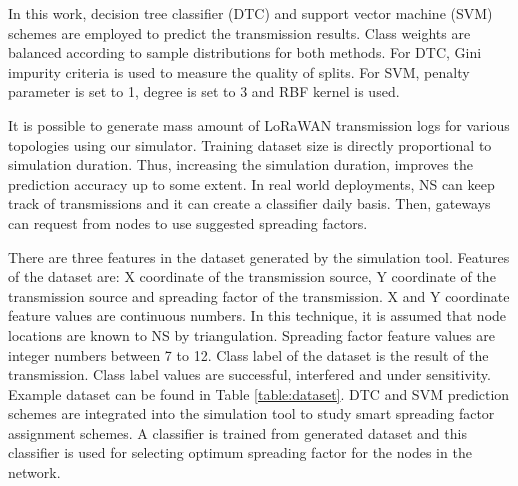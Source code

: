 In this work, decision tree classifier (DTC) and support vector machine (SVM) \cite{Alpaydin} schemes are employed to predict the transmission results. Class weights are balanced according to sample distributions for both methods. For DTC, Gini impurity criteria is used to measure the quality of splits. For SVM, penalty parameter is set to 1, degree is set to 3 and RBF kernel is used.

It is possible to generate mass amount of LoRaWAN transmission logs for various topologies using our simulator. Training dataset size is directly proportional to simulation duration. Thus, increasing the simulation duration, improves the prediction accuracy up to some extent. In real world deployments, NS can keep track of transmissions and it can create a classifier daily basis. Then, gateways can request from nodes to use suggested spreading factors.

There are three features in the dataset generated by the simulation tool. Features of the dataset are: X coordinate of the transmission source, Y coordinate of the transmission source and spreading factor of the transmission. X and Y coordinate feature values are continuous numbers. In this technique, it is assumed that node locations are known to NS by triangulation. Spreading factor feature values are integer numbers between 7 to 12. Class label of the dataset is the result of the transmission. Class label values are successful, interfered and under sensitivity. Example dataset can be found in Table \ref{table:dataset}. DTC and SVM prediction schemes are integrated into the simulation tool to study smart spreading factor assignment schemes. A classifier is trained from generated dataset and this classifier is used for selecting optimum spreading factor for the nodes in the network.

